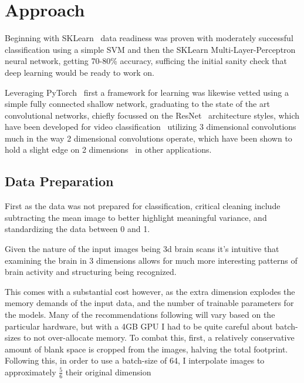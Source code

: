 \documentclass[10pt,twocolumn,letterpaper]{article}
\begin{document}
\section{Approach}\label{sec:approach}

Beginning with SKLearn~\cite{scikit-learn} data readiness was proven with moderately successful classification using
a simple SVM and then the SKLearn Multi-Layer-Perceptron neural network, getting 70-80\% accuracy, sufficing the
initial sanity check that deep learning would be ready to work on.

Leveraging PyTorch~\cite{paszke2017automatic} first a framework for learning was likewise vetted using a simple fully
connected shallow network, graduating to the state of the art convolutional networks, chiefly focussed
on the ResNet~\cite{he2016deep} architecture styles, which have been developed for video classification~\cite{tran2018closer}
utilizing 3 dimensional convolutions~\cite{hara3dcnns} much in the way 2 dimensional convolutions operate, which have
been shown to hold a slight edge on 2 dimensions~\cite{payan2015predicting} in other applications.


\subsection{Data Preparation}\label{subsec:data-preparation}

First as the data was not prepared for classification, critical cleaning include subtracting the mean image to better
highlight meaningful variance, and standardizing the data between 0 and 1.

Given the nature of the input images being 3d brain scans it's intuitive that examining the brain in 3 dimensions
allows for much more interesting patterns of brain activity and structuring being recognized.

This comes with a substantial cost however, as the extra dimension explodes the memory demands of the input data, and
the number of trainable parameters for the models.
Many of the recommendations following will vary based on the particular hardware, but with a 4GB GPU I had to be quite
careful about batch-sizes to not over-allocate memory.
To combat this, first, a relatively conservative amount of blank space is cropped from the images, halving the total footprint.
Following this, in order to use a batch-size of 64, I interpolate images to approximately $\frac{5}{6}$ their original dimension
\end{document}
